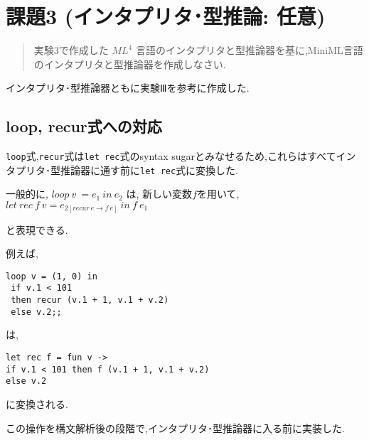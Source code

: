 \section*{課題3 (インタプリタ･型推論: 任意)}

\begin{quotation}
実験3で作成した $ML^4$ 言語のインタプリタと型推論器を基に,MiniML言語のインタプリタと型推論器を作成しなさい.
\end{quotation}

インタプリタ･型推論器ともに実験Ⅲを参考に作成した.

\subsection*{loop, recur式への対応}

\lstinline{loop}式,\lstinline{recur}式は\lstinline{let rec}式のsyntax sugarとみなせるため,これらはすべてインタプリタ･型推論器に通す前に\lstinline{let rec}式に変換した.

一般的に,
$ loop\ v\ = e_1\ in\ e_2 $
は, 新しい変数$f$を用いて,
$ let\ rec\ f\ v = e_{2 [recur\ e \rightarrow f\ e]}\ in\ f\ e_1 $

と表現できる.

例えば,

\begin{lstlisting}
loop v = (1, 0) in
 if v.1 < 101 
 then recur (v.1 + 1, v.1 + v.2) 
 else v.2;;
\end{lstlisting}

は,

\begin{lstlisting}
let rec f = fun v -> 
if v.1 < 101 then f (v.1 + 1, v.1 + v.2) 
else v.2
\end{lstlisting}

に変換される.

この操作を構文解析後の段階で,インタプリタ･型推論器に入る前に実装した.

